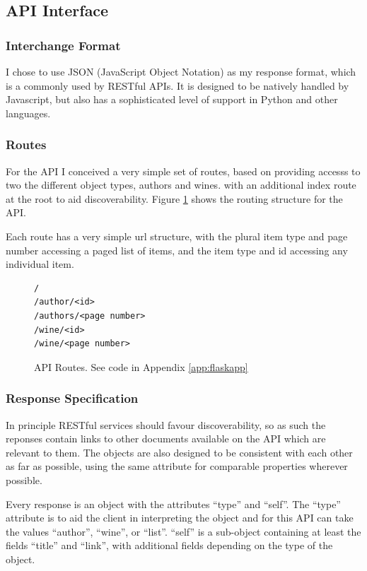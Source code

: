 \subsection{API Interface}

\subsubsection{Interchange Format}

I chose to use JSON (JavaScript Object Notation) as my response format, which is a commonly used by RESTful APIs. It is designed to be natively handled by Javascript, but also has a sophisticated level of support in Python and other languages. 

\subsubsection{Routes}

For the API I conceived a very simple set of routes, based on providing accesss to two the different object types, authors and wines. with an additional index route at the root to aid discoverability. Figure \ref{api:routes} shows the routing structure for the API.

Each route has a very simple url structure, with the plural item type and page number accessing a paged list of items, and the item type and id accessing any individual item.

\begin{figure}
\footnotesize
\caption{API Routes. See code in Appendix \ref{app:flaskapp}}\label{api:routes}
\begin{verbatim}
/
/author/<id>
/authors/<page number>
/wine/<id>
/wine/<page number>
\end{verbatim}
\end{figure}
\normalsize

\subsubsection{Response Specification}

In principle RESTful services should favour discoverability, so as such the reponses contain links to other documents available on the API which are relevant to them. The objects are also designed to be consistent with each other as far as possible, using the same attribute for comparable properties wherever possible. 

Every response is an object with the attributes ``type'' and ``self''. The ``type'' attribute is to aid the client in interpreting the object and for this API can take the values ``author'', ``wine'', or ``list''. ``self'' is a sub-object containing at least the fields ``title'' and ``link'', with additional fields depending on the type of the object.

